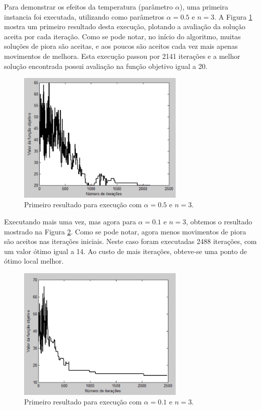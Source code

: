 \documentclass[conference]{IEEEtran}
\begin{document}
Para demonstrar os efeitos da temperatura (parâmetro $\alpha$), uma primeira instancia foi executada, utilizando como parâmetros $\alpha = 0.5$ e $n = 3$. A Figura \ref{fig:result-1} mostra um primeiro resultado desta execução, plotando a avaliação da solução aceita por cada iteração. Como se pode notar, no início do algoritmo, muitas soluções de piora são aceitas, e aos poucos são aceitos cada vez mais apenas movimentos de melhora. Esta execução passou por 2141 iterações e a melhor solução encontrada possui avaliação na função objetivo igual a 20.

	\begin{figure}[h]
		\centering
		\includegraphics[width=8cm]{img/result-1.png}
		\caption{Primeiro resultado para execução com $\alpha = 0.5$ e $n = 3$.}
		\label{fig:result-1}
	\end{figure}

Executando mais uma vez, mas agora para $\alpha = 0.1$ e $n = 3$, obtemos o resultado mostrado na Figura \ref{fig:result-2}. Como se pode notar, agora menos movimentos de piora são aceitos nas iterações iniciais. Neste caso foram executadas 2488 iterações, com um valor ótimo igual a 14. Ao custo de mais iterações, obteve-se uma ponto de ótimo local melhor.

	\begin{figure}[h]
		\centering
		\includegraphics[width=8cm]{img/result-2.png}
		\caption{Primeiro resultado para execução com $\alpha = 0.1$ e $n = 3$.}
		\label{fig:result-2}
	\end{figure}
\end{document}
